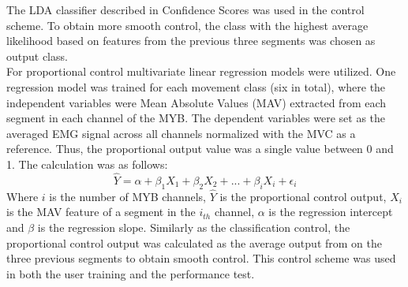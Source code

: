 The LDA classifier described in Confidence Scores was used in the control scheme. To obtain more smooth control, the class with the highest average likelihood based on features from the previous three segments was chosen as output class. \\
For proportional control multivariate linear regression models were utilized. One regression model was trained for each movement class (six in total), where the independent variables were Mean Absolute Values (MAV) extracted from each segment in each channel of the MYB. The dependent variables were set as the averaged EMG signal across all channels normalized with the MVC as a reference. Thus, the proportional output value was a single value between 0 and 1. The calculation was as follows: 
\vspace{-0.1cm}
\begin{equation} \label{eq:P:multiLinearRegression}
\hat{Y} = \alpha + \beta_1 X_{1} + \beta_2 X_{2} + ... + \beta_i X_{i} + \epsilon_i
\end{equation} 
\vspace{-0.05cm}
Where $i$ is the number of MYB channels, $\hat{Y}$ is the proportional control output, $X_{i}$ is the MAV feature of a segment in the $i_{th}$ channel, $\alpha$ is the regression intercept and $\beta$ is the regression slope. Similarly as the classification control, the proportional control output was calculated as the average output from on the three previous segments to obtain smooth control. This control scheme was used in both the user training and the performance test.